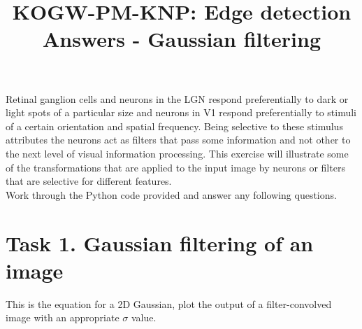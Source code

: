 \documentclass[12pt,english]{scrartcl}
\title{KOGW-PM-KNP: Edge detection Answers - Gaussian filtering}
\begin{document}
\maketitle
Retinal ganglion cells and neurons in the LGN respond preferentially to dark or light spots of a particular size and neurons in V1 respond preferentially to stimuli of a certain orientation and spatial frequency. Being selective to these stimulus attributes the neurons act as filters that pass some information and not other to the next level of visual information processing. This exercise will illustrate some of the transformations that are applied to the input image by neurons or filters that are selective for different features.\\
\bigskip
Work through the Python code provided and answer any following questions. 
\section*{Task 1. Gaussian filtering of an image}

 This is the equation for a 2D Gaussian, plot the output of a filter-convolved image with an appropriate $\sigma$ value.
 
\end{document}
